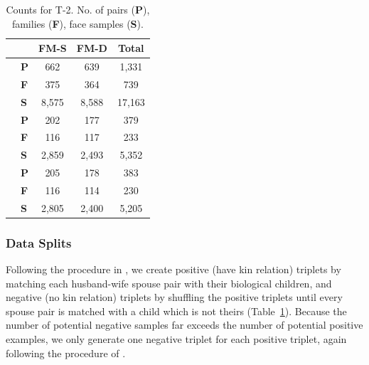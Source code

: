 \documentclass[letterpaper, 10 pt, conference]{ieeeconf}
\begin{document}
\begin{table}[b]
    \centering
    
    \caption{Counts for T-2. No. of pairs (\textbf{P}), families (\textbf{F}), face samples (\textbf{S}).}
    \small
    \begin{tabular}{p{.1in}m{.1in}ccc}
    & &FM-S &FM-D &Total\\\hline
     \parbox[t]{2mm}{
     }&\textbf{P} & 662  & 639 &1,331 \\
     &\textbf{F}  &375 & 364 & 739\\
     &\textbf{S} &8,575& 8,588 &  17,163\\\hline
    
    \parbox[t]{2mm}{
    } &\textbf{P}  & 202 & 177 & 379 \\
     &\textbf{F}  &116  & 117& 233\\
     &\textbf{S}  & 2,859 & 2,493 & 5,352 \\\hline
    \parbox[t]{2mm}{
    } &\textbf{P}  &  205& 178 & 383  \\
     &\textbf{F}  & 116  & 114  & 230 \\
     &\textbf{S}  & 2,805 &2,400 &5,205\\\hline
    
    \end{tabular}\label{tbl:track2:counts} 
\end{table}


\subsubsection{Data Splits}


Following the procedure in \cite{qin2015tri}, we create positive (have kin relation) triplets by matching each husband-wife spouse pair with their biological children, and negative (no kin relation) triplets by shuffling the positive triplets until every spouse pair is matched with a child which is not theirs (Table~\ref{tbl:track2:counts}).
Because the number of potential negative samples far exceeds the number of potential positive examples, we only generate one negative triplet for each positive triplet, again following the procedure of \cite{qin2015tri}. 
\end{document}
